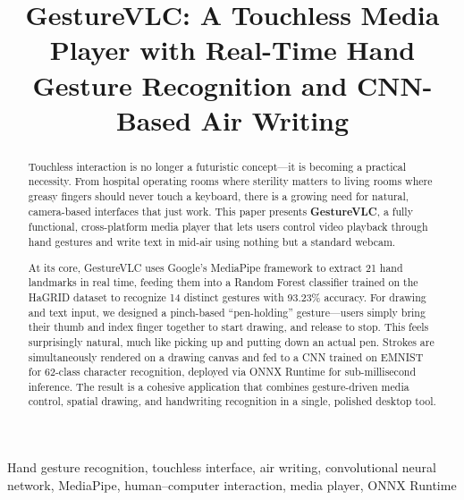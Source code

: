 \documentclass[conference]{IEEEtran}
\begin{document}
\title{GestureVLC: A Touchless Media Player with Real-Time Hand Gesture Recognition and CNN-Based Air Writing}

\author{
\and
{}
\and
{}
}

\maketitle

\begin{abstract}
Touchless interaction is no longer a futuristic concept---it is becoming a practical necessity. From hospital operating rooms where sterility matters to living rooms where greasy fingers should never touch a keyboard, there is a growing need for natural, camera-based interfaces that just work. This paper presents \textbf{GestureVLC}, a fully functional, cross-platform media player that lets users control video playback through hand gestures and write text in mid-air using nothing but a standard webcam.

At its core, GestureVLC uses Google's MediaPipe framework to extract 21 hand landmarks in real time, feeding them into a Random Forest classifier trained on the HaGRID dataset to recognize 14 distinct gestures with 93.23\% accuracy. For drawing and text input, we designed a pinch-based ``pen-holding'' gesture---users simply bring their thumb and index finger together to start drawing, and release to stop. This feels surprisingly natural, much like picking up and putting down an actual pen. Strokes are simultaneously rendered on a drawing canvas and fed to a CNN trained on EMNIST for 62-class character recognition, deployed via ONNX Runtime for sub-millisecond inference. The result is a cohesive application that combines gesture-driven media control, spatial drawing, and handwriting recognition in a single, polished desktop tool.
\end{abstract}

\begin{IEEEkeywords}
Hand gesture recognition, touchless interface, air writing, convolutional neural network, MediaPipe, human--computer interaction, media player, ONNX Runtime
\end{IEEEkeywords}
\end{document}

